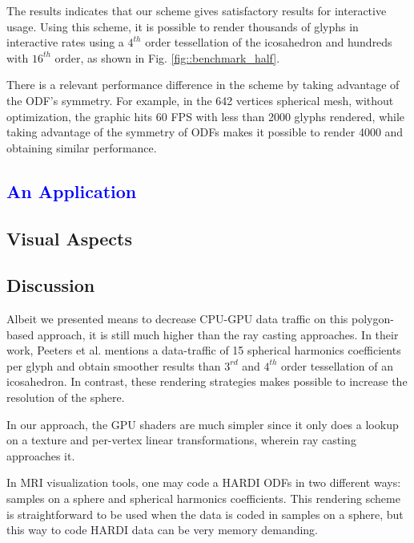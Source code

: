 \documentclass[twoside,twocolumn,10pt]{article}
\begin{document}
The results indicates that our scheme gives satisfactory results for interactive usage. Using this scheme, it is possible to render thousands of glyphs in interactive rates using a $4^{th}$ order tessellation of the icosahedron and hundreds with $16^{th}$ order, as shown in Fig. \ref{fig::benchmark_half}.

There is a relevant performance difference in the scheme by taking advantage of the ODF's symmetry. For example, in the 642 vertices spherical mesh, without optimization, the graphic hits 60 FPS with less than 2000 glyphs rendered, while taking advantage of the symmetry of ODFs makes it possible to render 4000 and obtaining similar performance.









\subsection{\textcolor{blue}{An Application}}


\subsection{Visual Aspects}


\subsection{Discussion}

Albeit we presented means to decrease CPU-GPU data traffic on this polygon-based approach, it is still much higher than the ray casting approaches. In their work, Peeters et al. \cite{peeters2009} mentions a data-traffic of 15 spherical harmonics coefficients per glyph and obtain smoother results than $3^{rd}$ and $4^{th}$ order tessellation of an icosahedron. In contrast, these rendering strategies makes possible to increase the resolution of the sphere.

In our approach, the GPU shaders are much simpler since it only does a lookup on a texture and per-vertex linear transformations, wherein ray casting approaches it.

In MRI visualization tools, one may code a HARDI ODFs in two different ways: samples on a sphere and spherical harmonics coefficients. This rendering scheme is straightforward to be used when the data is coded in samples on a sphere, but this way to code HARDI data can be very memory demanding.
\end{document}
